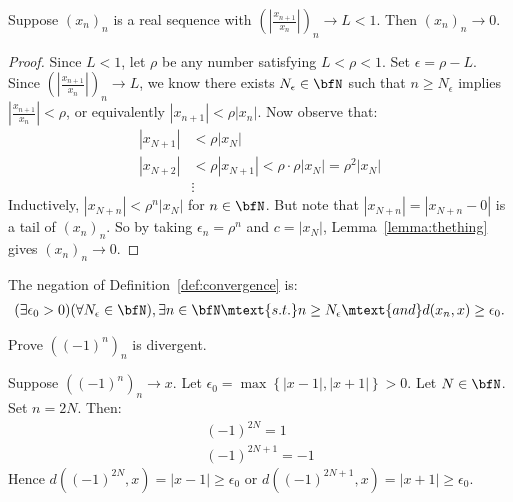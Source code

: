     \begin{proposition}
        Suppose $(x_n)_n$ is a real sequence with $\left(\left|\frac{x_{n+1}}{x_n}\right|\right)_n \rightarrow L < 1$. Then $(x_n)_n \rightarrow 0$.
    \end{proposition}
        \begin{proof}
            Since $L<1$, let $\rho$ be any number satisfying $L < \rho < 1$. Set $\epsilon = \rho - L$. Since $\left(\left|\frac{x_{n+1}}{x_n}\right|\right)_n \rightarrow L$, we know there exists $N_\epsilon \in \bfN$ such that $n \geq N_\epsilon$ implies $\left|\frac{x_{n+1}}{x_n}\right| < \rho$, or equivalently $|x_{n+1}| < \rho|x_n|$. Now observe that:
                \begin{equation*}
                \begin{split}
                    |x_{N+1}| &< \rho|x_N| \\
                    |x_{N+2}| &< \rho|x_{N+1}| < \rho \cdot \rho |x_N| = \rho^2 |x_N|\\
                    &\vdots
                \end{split}
                \end{equation*}
            Inductively, $|x_{N+n}| < \rho^n|x_N|$ for $n \in \bfN$. But note that $|x_{N+n}| = |x_{N+n} - 0|$ is a tail of $(x_n)_n$. So by taking $\epsilon_n = \rho^n$ and $c = |x_N|$, Lemma~\ref{lemma:thething} gives $(x_n)_n \rightarrow 0$.
        \end{proof}

    \begin{note}
        The negation of Definition~\ref{def:convergence} is:
            \begin{equation*}
            \begin{split}
                (\exists \epsilon_0 > 0)(\forall N_\epsilon \in \bfN), \exists n \in \bfN \mtext{s.t.} n \geq N_\epsilon \mtext{and} d(x_n,x) \geq \epsilon_0.
            \end{split}
            \end{equation*}
    \end{note}

    \begin{example}
        Prove $((-1)^n)_n$ is divergent.
    \end{example}
        \begin{solution}
            Suppose $((-1)^n)_n \rightarrow x$. Let $\epsilon_0 = \max \left\{|x-1|,|x+1|\right\} > 0$. Let $N \in \bfN$. Set $n = 2N$. Then:
                \begin{equation*}
                \begin{split}
                    (-1)^{2N} = 1 \\
                    (-1)^{2N+1} = -1
                \end{split}
                \end{equation*}
            Hence $d((-1)^{2N},x) = |x-1| \geq \epsilon_0$ or $d((-1)^{2N+1},x) = |x+1| \geq \epsilon_0$.
        \end{solution}

